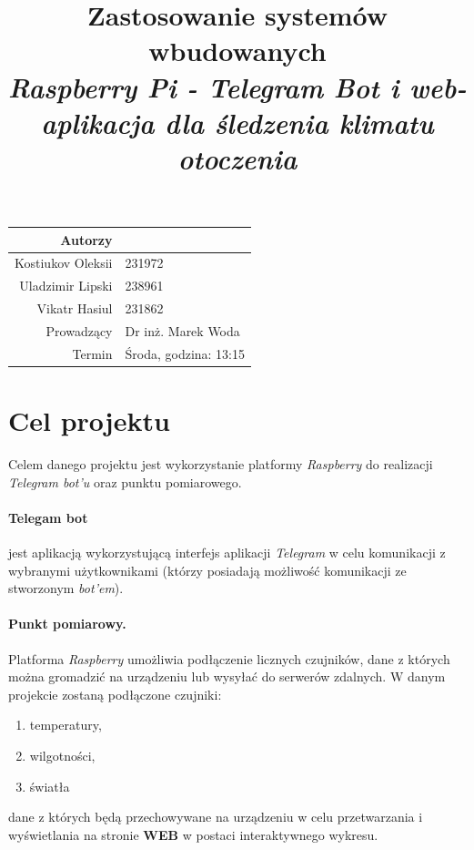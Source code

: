 \documentclass[a4paper]{article}
\title{
	\textbf{Zastosowanie systemów wbudowanych}\\
	\textit{Raspberry Pi - Telegram Bot i web-aplikacja dla śledzenia klimatu otoczenia}
	}
\date{}
\begin{document}
\begin{table}
	\vspace{-2cm}
	\begin{tabular}{rl}
		Autorzy & \\
			\hline
		Kostiukov Oleksii 	& 231972\\
		Uladzimir Lipski	& 238961\\
		Vikatr Hasiul 		& 231862\\[0.4cm]
			\hline
		Prowadzący 	& Dr inż. Marek Woda \\
		Termin		& Środa, godzina: 13:15\\
	\end{tabular}
\end{table}

{\let\newpage\relax\maketitle}
\maketitle
\thispagestyle{empty} %

\maketitle
\newpage
\section{Cel projektu}
	Celem danego projektu jest wykorzystanie platformy \textit{Raspberry} 
	do realizacji \textit{Telegram bot'u} oraz punktu pomiarowego.

	\paragraph{Telegam bot} jest aplikacją wykorzystującą interfejs aplikacji \textit{Telegram}
	w celu komunikacji z wybranymi użytkownikami (którzy posiadają możliwość komunikacji ze stworzonym
	\textit{bot'em}).

	\paragraph{Punkt pomiarowy.} Platforma \textit{Raspberry} umożliwia podłączenie licznych
	czujników, dane z których można gromadzić na urządzeniu lub wysyłać do serwerów zdalnych.
	W danym projekcie zostaną podłączone czujniki:
	\begin{enumerate}
		\item temperatury,
		\item wilgotności,
		\item światła
	\end{enumerate}
	dane z których będą przechowywane na urządzeniu w celu przetwarzania i 
	wyświetlania na stronie \textbf{WEB} w postaci interaktywnego wykresu.
	
\end{document}

